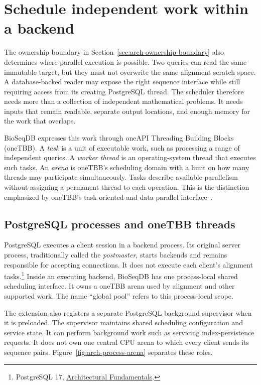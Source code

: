 \section{Schedule independent work within a backend}
\label{sec:arch-scheduling}

The ownership boundary in Section~\ref{sec:arch-ownership-boundary} also
determines where parallel execution is possible. Two queries can read the
same immutable target, but they must not overwrite the same alignment
scratch space. A database-backed reader may expose the right sequence
interface while still requiring access from its creating PostgreSQL thread.
The scheduler therefore needs more than a collection of independent
mathematical problems. It needs inputs that remain readable, separate output
locations, and enough memory for the work that overlaps.

BioSeqDB expresses this work through oneAPI Threading Building Blocks
(oneTBB). A \emph{task} is a unit of executable work, such as processing a
range of independent queries. A \emph{worker thread} is an operating-system
thread that executes such tasks. An \emph{arena} is oneTBB's scheduling
domain with a limit on how many threads may participate simultaneously.
Tasks describe available parallelism without assigning a permanent thread
to each operation. This is the distinction emphasized by oneTBB's
task-oriented and data-parallel interface~\autocite{onetbbBenefits}.

\subsection{PostgreSQL processes and oneTBB threads}
\label{sec:arch-process-boundary}

PostgreSQL executes a client session in a backend process. Its original
server process, traditionally called the \emph{postmaster}, starts backends
and remains responsible for accepting connections. It does not execute
each client's alignment tasks.\footnote{PostgreSQL 17,
\href{https://www.postgresql.org/docs/17/tutorial-arch.html}
{Architectural Fundamentals}.}
Inside an executing backend, BioSeqDB has one process-local shared
scheduling interface. It owns a oneTBB arena used by alignment and other supported
work. The name ``global pool'' refers to this process-local scope.

The extension also registers a separate PostgreSQL background supervisor
when it is preloaded. The supervisor maintains shared scheduling
configuration and service state. It can perform background work such as
servicing index-persistence requests. It does not own one central CPU arena
to which every client sends its sequence pairs.
Figure~\ref{fig:arch-process-arena} separates these roles.

